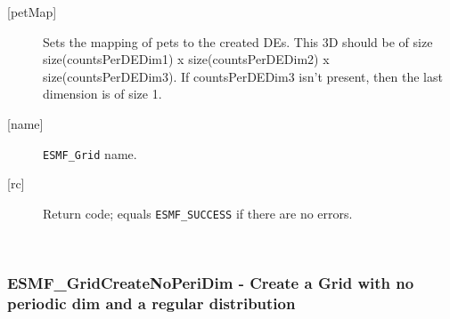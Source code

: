 \begin{description}
   \item[{[petMap]}]
         \begin{sloppypar}
         Sets the mapping of pets to the created DEs. This 3D
         should be of size size(countsPerDEDim1) x size(countsPerDEDim2) x
         size(countsPerDEDim3). If countsPerDEDim3 isn't present, then
         the last dimension is of size 1.
         \end{sloppypar}
   \item[{[name]}]
            {\tt ESMF\_Grid} name.
   \item[{[rc]}]
        Return code; equals {\tt ESMF\_SUCCESS} if there are no errors.
   \end{description}
   
 
\mbox{}\hrulefill\ 
 
\subsubsection [ESMF\_GridCreateNoPeriDim] {ESMF\_GridCreateNoPeriDim - Create a Grid with no periodic dim and a regular distribution}


